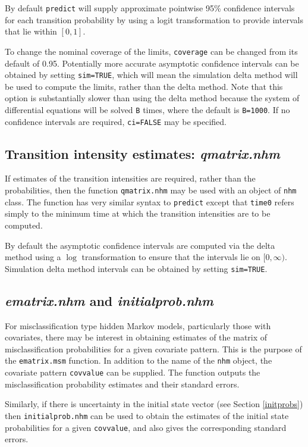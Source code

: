 \documentclass{article}
\numberwithin{equation}{section}
\begin{document}
By default \verb!predict! will supply approximate pointwise 95\% confidence intervals for each transition probability by using a logit transformation to provide intervals that lie within $[0,1]$.

To change the nominal coverage of the limits, \verb!coverage! can be changed from its default of 0.95. Potentially more accurate asymptotic confidence intervals can be obtained by setting \verb!sim=TRUE!, which will mean the simulation delta method \cite{mandel} will be used to compute the limits, rather than the delta method. Note that this option is substantially slower than using the delta method because the system of differential equations will be solved \verb!B! times, where the default is \verb!B=1000!. If no confidence intervals are required, \verb!ci=FALSE! may be specified.

\subsection{Transition intensity estimates: {\it qmatrix.nhm}}

If estimates of the transition intensities are required, rather than the probabilities, then the function \verb!qmatrix.nhm! may be used with an object of \verb!nhm! class. The function has very similar syntax to \verb!predict! except that \verb!time0! refers simply to the minimum time at which the transition intensities are to be computed.

By default the asymptotic confidence intervals are computed via the delta method using a $\log$ transformation to ensure that the intervals lie on $[0, \infty)$. Simulation delta method intervals can be obtained by setting \verb!sim=TRUE!.

\subsection{{\it ematrix.nhm} and {\it initialprob.nhm}}

For misclassification type hidden Markov models, particularly those with covariates, there may be interest in obtaining estimates of the matrix of misclassification probabilities for a given covariate pattern. This is the purpose of the \verb!ematrix.msm! function. In addition to the name of the \verb!nhm! object, the covariate pattern \verb!covvalue! can be supplied. The function outputs the misclassification probability estimates and their standard errors.

Similarly, if there is uncertainty in the initial state vector (see Section \ref{initprobs}) then \verb!initialprob.nhm! can be used to obtain the estimates of the initial state probabilities for a given \verb!covvalue!, and also gives the corresponding standard errors.
\end{document}
